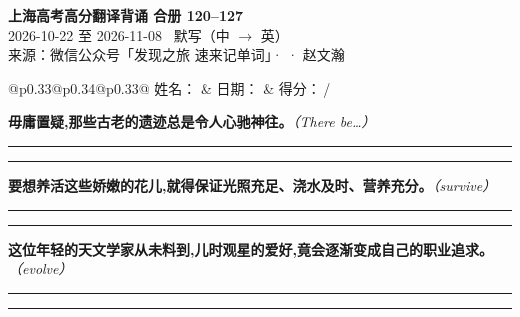 \documentclass[11pt,a4paper]{article}
\newcommand{\num}[1]{\makebox[1.9em][r]{#1.}\hspace{0.3em}}
\newcommand{\wline}{\noindent\rule{\linewidth}{0.4pt}}
\newcommand{\prompt}[1]{\emph{\textcolor{tipblue}{\small（#1）}}}
\begin{document}
\pagestyle{plain}
\begin{center}
{\LARGE\bfseries 上海高考高分翻译背诵 \quad 合册 120–127}\\[0.25em]
{\large 2026-10-22 至 2026-11-08 \quad\ 默写（中 $\to$ 英）}\\[0.35em]
{\footnotesize 来源：微信公众号「发现之旅 速来记单词」·  · 赵文瀚}
\end{center}

\vspace{0.4em}
\noindent\begin{tabular}{@{}p{0.33\textwidth}@{}p{0.34\textwidth}@{}p{0.33\textwidth}@{}}
姓名：\underline{\hspace{2.0cm}} & 日期：\underline{\hspace{2.0cm}} & 得分：\underline{\hspace{1.4cm}}\,/ \\
\end{tabular}

\vspace{0.5em}

\vspace{0.8em}
\vspace{0.35em}\vspace{0.15em}

\begin{minipage}{\linewidth}

\num{1}\textbf{毋庸置疑,那些古老的遗迹总是令人心驰神往。}\prompt{There be…}

\vspace{0.3em}

\wline\vspace{0.3em}
\wline

\end{minipage}

\begin{minipage}{\linewidth}

\num{2}\textbf{要想养活这些娇嫩的花儿,就得保证光照充足、浇水及时、营养充分。}\prompt{survive}

\vspace{0.3em}

\wline\vspace{0.3em}
\wline

\end{minipage}

\begin{minipage}{\linewidth}

\num{3}\textbf{这位年轻的天文学家从未料到,儿时观星的爱好,竟会逐渐变成自己的职业追求。}\prompt{evolve}

\vspace{0.3em}

\wline\vspace{0.3em}
\wline

\end{minipage}
\end{document}
